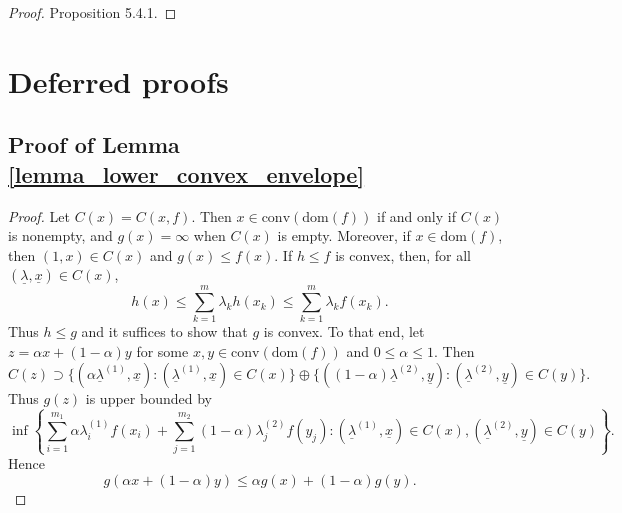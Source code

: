 \documentclass[12pt]{article}
\begin{document}
\begin{proof}
\cite{Bertsekas2009} Proposition 5.4.1.
\end{proof}


\section{Deferred proofs}


\subsection{Proof of Lemma \ref{lemma_lower_convex_envelope}}

\begin{proof}
Let $C(x) = C(x,f)$.
Then $x \in \mathrm{conv}(\mathrm{dom}(f))$ if and only if $C(x)$ is nonempty, and $g(x)=\infty$ when $C(x)$ is empty.
Moreover, if $x \in \mathrm{dom}(f)$, then $(1,x) \in C(x)$ and $g(x) \le f(x)$.
If $h \le f$ is convex, then, for all $(\underline{\lambda},\underline{x}) \in C(x)$,
\begin{equation*}
h(x) \le \sum_{k=1}^{m} \lambda_{k} h(x_{k})
\le \sum_{k=1}^{m} \lambda_{k} f(x_{k}).
\end{equation*}
Thus $h \le g$ and it suffices to show that $g$ is convex.
To that end, let $z = \alpha x + (1-\alpha) y$ for some $x,y \in \mathrm{conv}(\mathrm{dom}(f))$ and $0 \le \alpha \le 1$.
Then
\begin{equation*}
C(z) \supset \{ (\alpha \underline{\lambda}^{(1)},\underline{x}) : (\underline{\lambda}^{(1)},\underline{x}) \in C(x) \} \oplus \{  ( (1-\alpha) \underline{\lambda}^{(2)},\underline{y}) : (\underline{\lambda}^{(2)},\underline{y}) \in C(y) \}.
\end{equation*}
Thus $g(z)$ is upper bounded by
\begin{equation*}
\inf \left \{ \sum_{i=1}^{ m_{1}} \alpha \lambda_{i}^{(1)} f(x_{i}) \! + \! \sum_{j=1}^{m_{2}} (1 \! - \! \alpha) \lambda_{j}^{(2)} f(y_{j}) : (\underline{\lambda}^{(1)},\underline{x}) \in C(x), (\underline{\lambda}^{(2)},\underline{y}) \in C(y)  \right\}.
\end{equation*}
Hence
\begin{equation*}
g(\alpha x + (1- \alpha) y) \le \alpha g(x) + (1- \alpha)g(y).
\end{equation*}
\end{proof}
\end{document}
